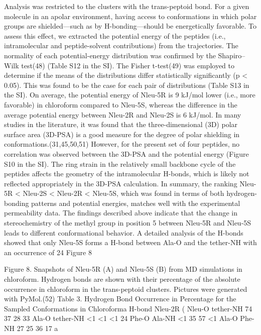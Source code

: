 Analysis was restricted to the clusters with the trans-peptoid bond.
For a given molecule in an apolar environment, having access to conformations in which polar groups are shielded—such as by H-bonding—should be energetically favorable. To assess this effect, we extracted the potential energy of the peptides (i.e., intramolecular and peptide-solvent contributions) from the trajectories. The normality of each potential-energy distribution was confirmed by the Shapiro–Wilk test(48) (Table S12 in the SI). The Fisher t-test(49) was employed to determine if the means of the distributions differ statistically significantly (p < 0.05). This was found to be the case for each pair of distributions (Table S13 in the SI). On average, the potential energy of Nleu-5R is 9 kJ/mol lower (i.e., more favorable) in chloroform compared to Nleu-5S, whereas the difference in the average potential energy between Nleu-2R and Nleu-2S is 6 kJ/mol. In many studies in the literature, it was found that the three-dimensional (3D) polar surface area (3D-PSA) is a good measure for the degree of polar shielding in conformations.(31,45,50,51) However, for the present set of four peptides, no correlation was observed between the 3D-PSA and the potential energy (Figure S10 in the SI). The ring strain in the relatively small backbone cycle of the peptides affects the geometry of the intramolecular H-bonds, which is likely not reflected appropriately in the 3D-PSA calculation. In summary, the ranking Nleu-5R < Nleu-2S < Nleu-2R < Nleu-5S, which was found in terms of both hydrogen-bonding patterns and potential energies, matches well with the experimental permeability data.
The findings described above indicate that the change in stereochemistry of the methyl group in position 5 between Nleu-5R and Nleu-5S leads to different conformational behavior. A detailed analysis of the H-bonds showed that only Nleu-5S forms a H-bond between Ala-O and the tether-NH with an occurrence of 24%
Figure 8

Figure 8. Snapshots of Nleu-5R (A) and Nleu-5S (B) from MD simulations in chloroform. Hydrogen bonds are shown with their percentage of the absolute occurrence in chloroform in the trans-peptoid clusters. Pictures were generated with PyMol.(52)
Table 3. Hydrogen Bond Occurrence in Percentage for the Sampled Conformations in Chloroforma
H-bond	Nleu-2R (%
Nleu-O tether-NH	74	37	28	33
Ala-O tether-NH	<1	<1	<1	24
Phe-O Ala-NH	<1	35	57	<1
Ala-O Phe-NH	27	25	36	17
a

